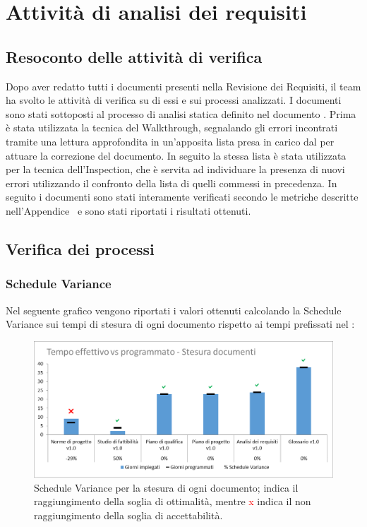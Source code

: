 \newpage
\section{Attività di analisi dei requisiti}
\subsection{Resoconto delle attività di verifica}

Dopo aver redatto tutti i documenti presenti nella Revisione dei Requisiti, il team ha svolto le attività di verifica su di essi e sui processi analizzati. I documenti sono stati sottoposti al processo di analisi statica definito nel documento \NdP{}.
Prima è stata utilizzata la tecnica del Walkthrough, segnalando gli errori incontrati tramite una lettura approfondita in un'apposita lista presa in carico dal \ver{} per attuare la correzione del documento. In seguito la stessa lista è stata utilizzata per la tecnica dell'Inspection, che è servita ad individuare la presenza di nuovi errori utilizzando il confronto della lista di quelli commessi in precedenza.
In seguito i documenti sono stati interamente verificati secondo le metriche descritte nell'Appendice~ e sono stati riportati i risultati ottenuti.

\subsection{Verifica dei processi}
\subsubsection{Schedule Variance}
Nel seguente grafico vengono riportati i valori ottenuti calcolando la Schedule Variance sui tempi di stesura di ogni documento rispetto ai tempi prefissati nel \PdP{}:

\begin{figure}[h!]
	\centering
	\includegraphics[scale=0.75]{img/Grafici/SV-Documenti.png}
		\caption{Schedule Variance per la stesura di ogni documento; \textcolor{green}{\checkmark} indica il raggiungimento della soglia di ottimalità, mentre \textcolor{red}{x} indica il non raggiungimento della soglia di accettabilità.}
	\label{fig:SV-Documenti}
\end{figure}

